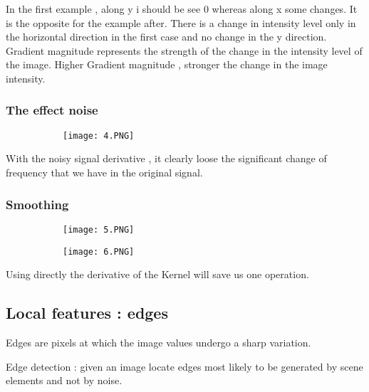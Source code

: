 \documentclass{article}
\begin{document}
In the first example , along y i should be see 0 whereas along x some changes. It is the opposite for the example after. There is a change in intensity level only in the horizontal direction in the first case and no change in the y direction.
Gradient magnitude represents the strength of the change in the intensity level of the image. Higher Gradient magnitude , stronger the change in the image intensity.

\subsubsection{The effect noise}

\begin{figure}[ht!]
  \centering
  \begin{subfigure}[b]{0.6\linewidth}
    \texttt{[image: 4.PNG]}
  \end{subfigure}
\end{figure}

With the noisy signal derivative , it clearly loose the significant change of frequency that we have in the original signal.

\vspace{40mm}

\subsubsection{Smoothing}

\begin{figure}[ht!]
  \centering
  \begin{subfigure}[b]{0.5\linewidth}
    \texttt{[image: 5.PNG]}
  \end{subfigure}
     \begin{subfigure}[b]{0.49\textwidth}
         \centering
         \texttt{[image: 6.PNG]}
     \end{subfigure}
\end{figure}

Using directly the derivative of the Kernel will save us one operation.

\subsection{Local features : edges}

Edges are pixels at which the image values undergo a sharp variation.

Edge detection : given an image locate edges most likely to be generated by scene elements and not by noise.
\end{document}
